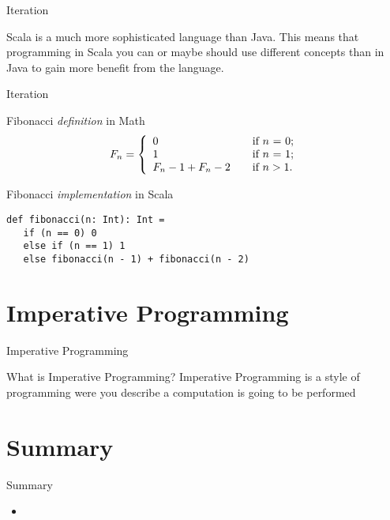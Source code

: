 \begin{frame}[fragile]{Iteration}
\begin{center}
Scala is a much more sophisticated language than Java. This means that
programming in Scala you can or maybe should use different concepts than in Java
to gain more benefit from the language.
\end{center}
\end{frame}

\begin{frame}[fragile]{Iteration}
\begin{exampleblock}{Fibonacci \emph{definition} in Math}
\[
  F_n = \left\{
  \begin{array}{l l}
    	0 & \quad \textrm{if $n$ = 0;}\\
    	1 & \quad \textrm{if $n$ = 1;}\\
    	F_n-1 + F_n-2 & \quad \textrm{if $n > 1$.}\\
  \end{array} \right.
\]
\end{exampleblock}
\pause
\begin{exampleblock}{Fibonacci \emph{implementation} in Scala}
\begin{lstlisting}
def fibonacci(n: Int): Int =
   if (n == 0) 0
   else if (n == 1) 1
   else fibonacci(n - 1) + fibonacci(n - 2)
\end{lstlisting}
\end{exampleblock}
\end{frame}

\section{Imperative Programming}
\begin{frame}{Imperative Programming}
\begin{block}{What is Imperative Programming?}
Imperative Programming is a style of programming were you describe
 a computation is going to be performed
\end{block}
\end{frame}
\section{Summary}
\begin{frame}{Summary}
\begin{itemize}
  \item 
\end{itemize}
\end{frame}